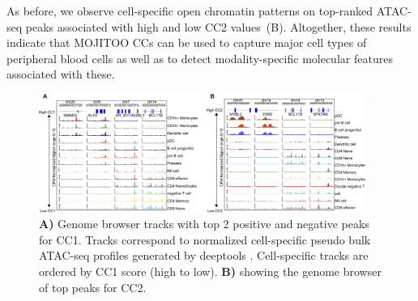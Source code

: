 As before, we observe cell-specific open chromatin patterns on top-ranked ATAC-seq peaks associated with high and low CC2 values~(B). Altogether, these results indicate that MOJITOO CCs can be used to capture major cell types of peripheral blood cells as well as to detect modality-specific molecular features associated with these.

\begin{figure}[!h]
	\centering
	\includegraphics[width=0.95\textwidth]{CC_Peaks/fig}
	\vspace{0.1cm}
	\caption[Genome browser tracks of top 2 positive and negative peaks for CC1 and CC2.]{\textbf{A)} Genome browser tracks with top 2 positive and negative peaks for CC1. Tracks correspond to normalized cell-specific pseudo bulk ATAC-seq profiles generated by deeptools \citep{ramirez2016deeptools2}. Cell-specific tracks are ordered by CC1 score (high to low). \textbf{B)} showing the genome browser of top peaks for CC2.}
	\label{fig:CC_Peaks}
\end{figure}


